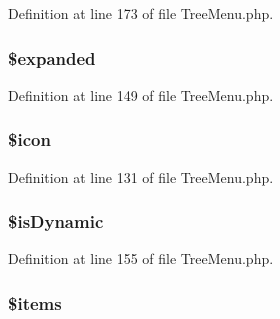 \-Definition at line 173 of file \-Tree\-Menu.\-php.

\hypertarget{class_h_t_m_l___tree_node_a7ed9085c091e8b2ceed7949e9ef1f6b8}{
\subsubsection[{\$expanded}]{\setlength{\rightskip}{0pt plus 5cm}\$expanded}}\label{class_h_t_m_l___tree_node_a7ed9085c091e8b2ceed7949e9ef1f6b8}


\-Definition at line 149 of file \-Tree\-Menu.\-php.

\hypertarget{class_h_t_m_l___tree_node_ac13ca58494b5ebc7e5f1ded33256c9e9}{
\subsubsection[{\$icon}]{\setlength{\rightskip}{0pt plus 5cm}\$icon}}\label{class_h_t_m_l___tree_node_ac13ca58494b5ebc7e5f1ded33256c9e9}


\-Definition at line 131 of file \-Tree\-Menu.\-php.

\hypertarget{class_h_t_m_l___tree_node_aa927a23cfdd5d6ac3df6fc7eedd64475}{
\subsubsection[{\$is\-Dynamic}]{\setlength{\rightskip}{0pt plus 5cm}\$is\-Dynamic}}\label{class_h_t_m_l___tree_node_aa927a23cfdd5d6ac3df6fc7eedd64475}


\-Definition at line 155 of file \-Tree\-Menu.\-php.

\hypertarget{class_h_t_m_l___tree_node_a737abdef83dabb219182c1e88887c6c3}{
\subsubsection[{\$items}]{\setlength{\rightskip}{0pt plus 5cm}\$items}}\label{class_h_t_m_l___tree_node_a737abdef83dabb219182c1e88887c6c3}


